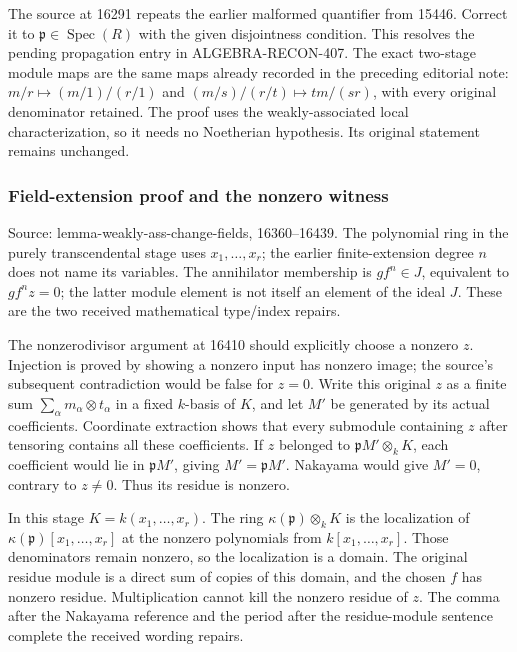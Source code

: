 The source at 16291 repeats the earlier malformed quantifier from 15446. Correct it to \(\mathfrak p\in\operatorname{Spec}(R)\) with the given disjointness condition. This resolves the pending propagation entry in ALGEBRA-RECON-407. The exact two-stage module maps are the same maps already recorded in the preceding editorial note: \(m/r\mapsto(m/1)/(r/1)\) and \((m/s)/(r/t)\mapsto tm/(sr)\), with every original denominator retained. The proof uses the weakly-associated local characterization, so it needs no Noetherian hypothesis. Its original statement remains unchanged.

\subsubsection{Field-extension proof and the nonzero witness}\label{field-extension-proof-and-the-nonzero-witness}

Source: lemma-weakly-ass-change-fields, 16360--16439. The polynomial ring in the purely transcendental stage uses \(x_1,\ldots,x_r\); the earlier finite-extension degree \(n\) does not name its variables. The annihilator membership is \(gf^n\in J\), equivalent to \(gf^nz=0\); the latter module element is not itself an element of the ideal \(J\). These are the two received mathematical type/index repairs.

The nonzerodivisor argument at 16410 should explicitly choose a nonzero \(z\). Injection is proved by showing a nonzero input has nonzero image; the source's subsequent contradiction would be false for \(z=0\). Write this original \(z\) as a finite sum \(\sum_\alpha m_\alpha\otimes t_\alpha\) in a fixed \(k\)-basis of \(K\), and let \(M'\) be generated by its actual coefficients. Coordinate extraction shows that every submodule containing \(z\) after tensoring contains all these coefficients. If \(z\) belonged to \(\mathfrak pM'\otimes_kK\), each coefficient would lie in \(\mathfrak pM'\), giving \(M'=\mathfrak pM'\). Nakayama would give \(M'=0\), contrary to \(z\ne0\). Thus its residue is nonzero.

In this stage \(K=k(x_1,\ldots,x_r)\). The ring \(\kappa(\mathfrak p)\otimes_kK\) is the localization of \(\kappa(\mathfrak p)[x_1,\ldots,x_r]\) at the nonzero polynomials from \(k[x_1,\ldots,x_r]\). Those denominators remain nonzero, so the localization is a domain. The original residue module is a direct sum of copies of this domain, and the chosen \(f\) has nonzero residue. Multiplication cannot kill the nonzero residue of \(z\). The comma after the Nakayama reference and the period after the residue-module sentence complete the received wording repairs.

